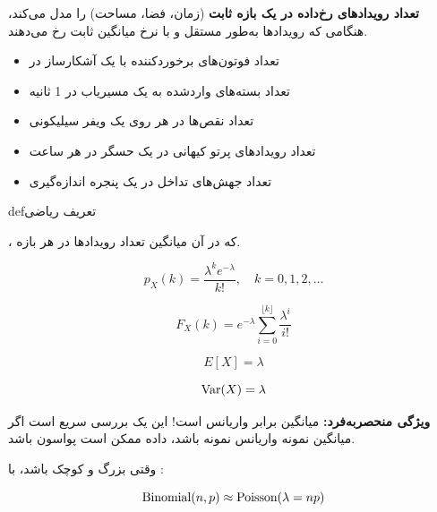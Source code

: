 

\textbf{تعداد رویدادهای رخ‌داده در یک بازه ثابت} (زمان، فضا، مساحت) را مدل می‌کند، هنگامی که رویدادها به‌طور مستقل و با نرخ میانگین ثابت رخ می‌دهند.


\begin{itemize}
\tightlist
\item
  تعداد فوتون‌های برخوردکننده با یک آشکارساز در 
\item
  تعداد بسته‌های واردشده به یک مسیریاب در 1 ثانیه
\item
  تعداد نقص‌ها در هر  روی یک ویفر سیلیکونی
\item
  تعداد رویدادهای پرتو کیهانی در یک حسگر در هر ساعت
\item
  تعداد جهش‌های تداخل در یک پنجره اندازه‌گیری
\end{itemize}

\begin{PSbox}[unbreakable]{def}{تعریف ریاضی}

، که در آن \lr{\ensuremath{\lambda} =} میانگین تعداد رویدادها در هر بازه.

\end{PSbox}


\[p_X(k) = \frac{\lambda^k e^{-\lambda}}{k!}, \quad k = 0, 1, 2, \ldots\]


\[F_X(k) = e^{-\lambda} \sum_{i=0}^{\lfloor k \rfloor} \frac{\lambda^i}{i!}\]


\[E[X] = \lambda\]


\[\text{Var}(X) = \lambda\]

\textbf{ویژگی منحصربه‌فرد:} میانگین برابر واریانس است! این یک بررسی سریع است  اگر میانگین نمونه \lr{\ensuremath{\approx}} واریانس نمونه باشد، داده ممکن است پواسون باشد.


وقتی  بزرگ و  کوچک باشد، با :

\[\text{Binomial}(n, p) \approx \text{Poisson}(\lambda = np)\]

